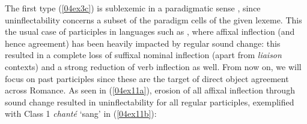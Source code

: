 \documentclass[output=paper,colorlinks,citecolor=brown]{langscibook}
\begin{document}
\largerpage[-1]

The first type (\ref{04ex3c}) is sublexemic in a paradigmatic sense , since uninflectability concerns a subset of the paradigm cells of the given lexeme. This the usual case of participles in languages such as , where affixal inflection (and hence agreement) has been heavily impacted by regular sound change: this resulted in a complete loss of suffixal nominal inflection (apart from \emph{liaison} contexts) and a strong reduction of verb inflection as well. From now on, we will focus on past participles since these are the target of direct object agreement across Romance. As seen in (\ref{04ex11a}), erosion of all affixal inflection through sound change resulted in uninflectability for all regular participles, exemplified with Class 1 \emph{chanté} `sang' in (\ref{04ex11b}):

\bigskip
\end{document}
